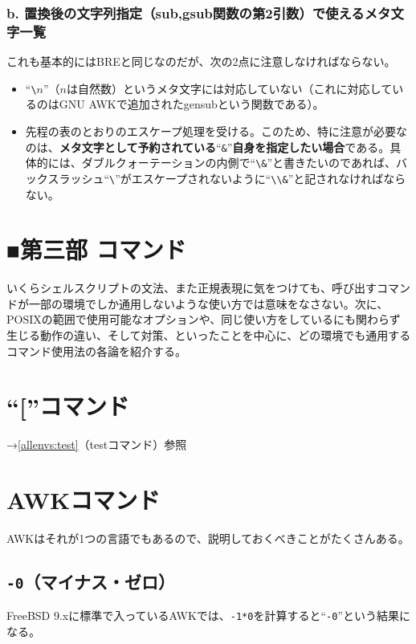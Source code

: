 \subsubsection*{b. 置換後の文字列指定（sub,gsub関数の第2引数）で使えるメタ文字一覧}
これも基本的にはBREと同じなのだが、次の2点に注意しなければならない。
\begin{itemize}
  \item ``\verb|\|$n$''（$n$は自然数）というメタ文字には対応していない（これに対応しているのはGNU AWKで追加されたgensubという関数である）。
  \item 先程の表のとおりのエスケープ処理を受ける。このため、特に注意が必要なのは、\textbf{メタ文字として予約されている}``\verb|&|''\textbf{自身を指定したい場合}である。具体的には、ダブルクォーテーションの内側で``\verb|\&|''と書きたいのであれば、バックスラッシュ``\verb|\|''がエスケープされないように``\verb|\\&|''と記されなければならない。
\end{itemize}


\section*{■第三部 コマンド}

いくらシェルスクリプトの文法、また正規表現に気をつけても、呼び出すコマンドが一部の環境でしか通用しないような使い方では意味をなさない。次に、POSIXの範囲で使用可能なオプションや、同じ使い方をしているにも関わらず生じる動作の違い、そして対策、といったことを中心に、どの環境でも通用するコマンド使用法の各論を紹介する。

\section{``[''コマンド}

\noindent
→\ref{allenvs:test}（testコマンド）参照

\section{AWKコマンド}
\label{allenvs:AWK}

AWKはそれが1つの言語でもあるので、説明しておくべきことがたくさんある。

\subsection*{\verb|-0|（マイナス・ゼロ）}

FreeBSD 9.xに標準で入っているAWKでは、\verb|-1*0|を計算すると``\verb|-0|''という結果になる。

